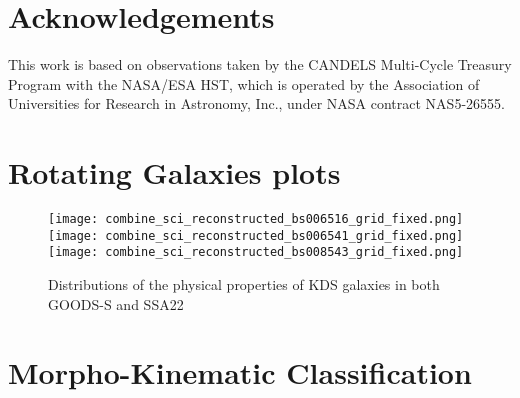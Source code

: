 \documentclass[a4paper,fleqn,usenatbib]{mn2e}
\begin{document}
\section*{Acknowledgements}

This work is based on observations taken by the CANDELS Multi-Cycle Treasury Program with the NASA/ESA HST, which is operated by the Association of Universities for Research in Astronomy, Inc., under NASA contract NAS5-26555.




%


\clearpage 

%




\appendix

\section{Rotating Galaxies plots}

\begin{figure*}
\centering
\texttt{[image: combine\_sci\_reconstructed\_bs006516\_grid\_fixed.png]}
\texttt{[image: combine\_sci\_reconstructed\_bs006541\_grid\_fixed.png]}
\texttt{[image: combine\_sci\_reconstructed\_bs008543\_grid\_fixed.png]}
\caption{Distributions of the physical properties of KDS galaxies in both GOODS-S and SSA22}
\label{fig:grids}
\end{figure*}

\section{Morpho-Kinematic Classification}\label{app:morpho-kinematic}



\bsp    %
\label{lastpage}
\end{document}
